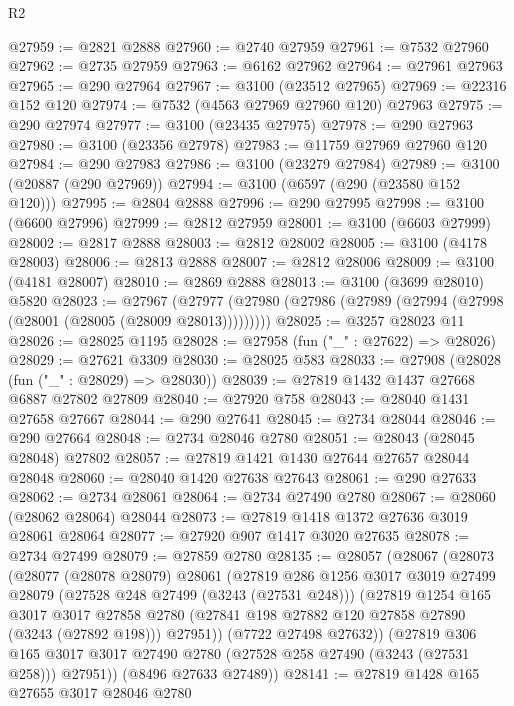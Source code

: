 \begin{lexlean}{R2}
\begin{coremodule}
@27959 := @2821 @2888
@27960 := @2740 @27959
@27961 := @7532 @27960
@27962 := @2735 @27959
@27963 := @6162 @27962
@27964 := @27961 @27963
@27965 := @290 @27964
@27967 := @3100 (@23512 @27965)
@27969 := @22316 @152 @120
@27974 := @7532 (@4563 @27969 @27960 @120) @27963
@27975 := @290 @27974
@27977 := @3100 (@23435 @27975)
@27978 := @290 @27963
@27980 := @3100 (@23356 @27978)
@27983 := @11759 @27969 @27960 @120
@27984 := @290 @27983
@27986 := @3100 (@23279 @27984)
@27989 := @3100 (@20887 (@290 @27969))
@27994 := @3100 (@6597 (@290 (@23580 @152 @120)))
@27995 := @2804 @2888
@27996 := @290 @27995
@27998 := @3100 (@6600 @27996)
@27999 := @2812 @27959
@28001 := @3100 (@6603 @27999)
@28002 := @2817 @2888
@28003 := @2812 @28002
@28005 := @3100 (@4178 @28003)
@28006 := @2813 @2888
@28007 := @2812 @28006
@28009 := @3100 (@4181 @28007)
@28010 := @2869 @2888
@28013 := @3100 (@3699 @28010) @5820
@28023 := @27967
    (@27977 (@27980 (@27986 (@27989 (@27994 (@27998 (@28001 (@28005 (@28009 @28013)))))))))
@28025 := @3257 @28023 @11
@28026 := @28025 @1195
@28028 := @27958 (fun ("_" : @27622) => @28026)
@28029 := @27621 @3309
@28030 := @28025 @583
@28033 := @27908 (@28028 (fun ("_" : @28029) => @28030))
@28039 := @27819 @1432 @1437 @27668 @6887 @27802 @27809
@28040 := @27920 @758
@28043 := @28040 @1431 @27658 @27667
@28044 := @290 @27641
@28045 := @2734 @28044
@28046 := @290 @27664
@28048 := @2734 @28046 @2780
@28051 := @28043 (@28045 @28048) @27802
@28057 := @27819 @1421 @1430 @27644 @27657 @28044 @28048
@28060 := @28040 @1420 @27638 @27643
@28061 := @290 @27633
@28062 := @2734 @28061
@28064 := @2734 @27490 @2780
@28067 := @28060 (@28062 @28064) @28044
@28073 := @27819 @1418 @1372 @27636 @3019 @28061 @28064
@28077 := @27920 @907 @1417 @3020 @27635
@28078 := @2734 @27499
@28079 := @27859 @2780
@28135 := @28057
    (@28067
      (@28073
        (@28077
          (@28078 @28079)
          @28061
          (@27819
            @286
            @1256
            @3017
            @3019
            @27499
            @28079
            (@27528 @248 @27499 (@3243 (@27531 @248)))
            (@27819
              @1254
              @165
              @3017
              @3017
              @27858
              @2780
              (@27841 @198 @27882 @120 @27858 @27890 (@3243 (@27892 @198)))
              @27951))
          (@7722 @27498 @27632))
        (@27819
          @306
          @165
          @3017
          @3017
          @27490
          @2780
          (@27528 @258 @27490 (@3243 (@27531 @258)))
          @27951))
      (@8496 @27633 @27489))
@28141 := @27819 @1428 @165 @27655 @3017 @28046 @2780

\end{coremodule}
\end{lexlean}
